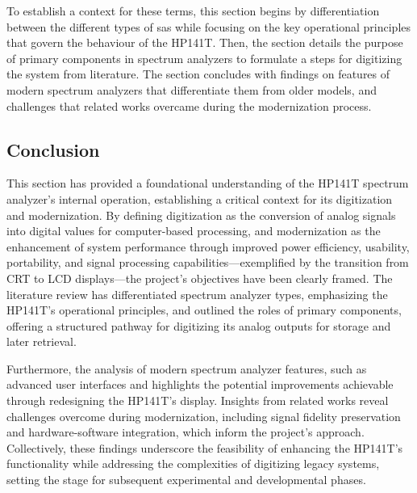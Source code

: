 \documentclass[class=report,11pt,crop=false]{standalone}
\begin{document}
To establish a context for these terms, this section begins by differentiation between the different types of \acrshort{sa}s while focusing on the key operational principles that govern the behaviour of the HP141T. Then, the section details the purpose of primary components in spectrum analyzers to formulate a steps for digitizing the system from literature. The section concludes with findings on features of modern spectrum analyzers that differentiate them from older models, and challenges that related works overcame during the modernization process.  

\subsection{Conclusion}

This section has provided a foundational understanding of the HP141T spectrum analyzer’s internal operation, establishing a critical context for its digitization and modernization. By defining digitization as the conversion of analog signals into digital values for computer-based processing, and modernization as the enhancement of system performance through improved power efficiency, usability, portability, and signal processing capabilities—exemplified by the transition from CRT to LCD displays—the project’s objectives have been clearly framed. The literature review has differentiated spectrum analyzer types, emphasizing the HP141T’s operational principles, and outlined the roles of primary components, offering a structured pathway for digitizing its analog outputs for storage and later retrieval.

Furthermore, the analysis of modern spectrum analyzer features, such as advanced user interfaces and highlights the potential improvements achievable through redesigning the HP141T’s display. Insights from related works reveal challenges overcome during modernization, including signal fidelity preservation and hardware-software integration, which inform the project’s approach. Collectively, these findings underscore the feasibility of enhancing the HP141T’s functionality while addressing the complexities of digitizing legacy systems, setting the stage for subsequent experimental and developmental phases.

\ifstandalone

\printnoidxglossary[type=\acronymtype,nonumberlist]
\fi
\end{document}
